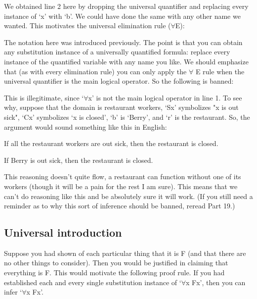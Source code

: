 \begin{fitchproof}
\end{fitchproof}

We obtained line 2 here by dropping the universal quantifier and replacing every instance of ‘x’ with ‘b’. We could have done the same with any other name we wanted. This motivates the universal elimination rule ($\forall$E):

The notation here was introduced previously. The point is that you can obtain any substitution instance of a universally quantified formula: replace every instance of the quantified variable with any name you like. We should emphasize that (as with every elimination rule) you can only apply the $\forall$ E rule when the universal quantifier is the main logical operator. So the following is banned:
\begin{fitchproof}
\end{fitchproof}

This is illegitimate, since `$\forall$x'  is not the main logical operator in line 1. To see why, suppose that the domain is restaurant workers, ‘Sx' symbolizes "x is out sick", ‘Cx' symbolizes ‘x is closed', ‘b' is ‘Berry', and ‘r' is the restaurant. So, the argument would sound something like this in English:
\begin{earg}
\item[]If all the restaurant workers are out sick, then the restaurant is closed.
\item[\therefore] If Berry is out sick, then the restaurant is closed.
\end{earg}
This reasoning doesn't quite flow, a restaurant can function without one of its workers (though it will be a pain for the rest I am sure). This means that we can't do reasoning like this and be absolutely sure it will work. (If you still need a reminder as to why this sort of inference should be banned, reread Part 19.)
\subsection{Universal introduction}

Suppose you had shown of each particular thing that it is F (and that there are no other things to consider). Then you would be justified in claiming that everything is F. This would motivate the following proof rule. If you had established each and every single substitution instance of ‘$\forall$x Fx', then you can infer ‘$\forall$x Fx’.

